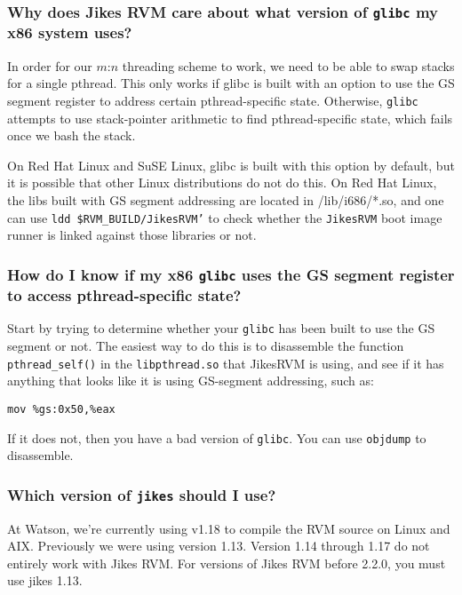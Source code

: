 \subsubsection{Why does Jikes RVM care about what version of \texttt{glibc} my x86 system uses?}

In
order for our $m$:$n$ threading scheme to work, we need to be able to swap
stacks for a single pthread.  This only works if glibc is built with an
option to use the GS segment register to address certain pthread-specific
state.  Otherwise, \texttt{glibc} attempts to use stack-pointer
arithmetic to find pthread-specific state, which fails once we bash the stack.

On Red Hat\TMweb{} Linux and SuSE\Rweb{} Linux, glibc is built with this option by
default, but it is possible that other Linux distributions do not do
this.  On Red Hat Linux, the libs built with GS segment addressing are
located in /lib/i686/*.so, and one can use \texttt{ldd
  \$RVM\_BUILD/JikesRVM'} to check whether the \texttt{JikesRVM} boot
image runner is linked against those libraries or not.

\subsubsection{How do I know if my x86 \texttt{glibc} uses the GS
  segment register to access pthread-specific state?}

Start by trying to determine whether your \texttt{glibc} has been
built to use the GS segment 
or not.  The easiest way to do this is to disassemble the function
\texttt{pthread\_self()} in the \texttt{libpthread.so} that JikesRVM is using, and see if it has
anything that looks like it is using GS-segment addressing, such as:
\begin{verbatim}
mov %gs:0x50,%eax
\end{verbatim}
If it does not, then you have a bad version of \texttt{glibc}.   You
can use \texttt{objdump} to disassemble.


\subsubsection{Which version of {\tt jikes} should I use?}
At Watson, we're currently using  v1.18
to compile the RVM source on Linux\Rweb{} and AIX\TMweb. Previously we
were using version 1.13. Version 1.14 through 1.17 do not entirely
work with Jikes RVM.  For versions of Jikes RVM before 2.2.0, you must
use jikes 1.13.

